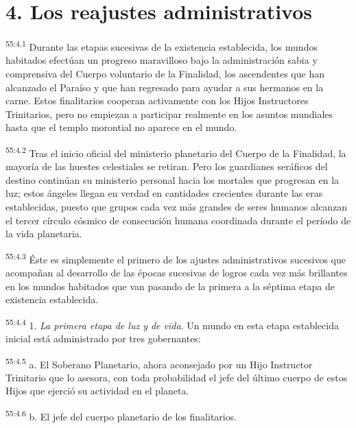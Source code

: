 \section*{4. Los reajustes administrativos}
\par
\textsuperscript{55:4.1} Durante las etapas sucesivas de la existencia establecida, los mundos habitados efectúan un progreso maravilloso bajo la administración sabia y comprensiva del Cuerpo voluntario de la Finalidad, los ascendentes que han alcanzado el Paraíso y que han regresado para ayudar a sus hermanos en la carne. Estos finalitarios cooperan activamente con los Hijos Instructores Trinitarios, pero no empiezan a participar realmente en los asuntos mundiales hasta que el templo morontial no aparece en el mundo.

\par
\textsuperscript{55:4.2} Tras el inicio oficial del ministerio planetario del Cuerpo de la Finalidad, la mayoría de las huestes celestiales se retiran. Pero los guardianes seráficos del destino continúan su ministerio personal hacia los mortales que progresan en la luz; estos ángeles llegan en verdad en cantidades crecientes durante las eras establecidas, puesto que grupos cada vez más grandes de seres humanos alcanzan el tercer círculo cósmico de consecución humana coordinada durante el período de la vida planetaria.

\par
\textsuperscript{55:4.3} Éste es simplemente el primero de los ajustes administrativos sucesivos que acompañan al desarrollo de las épocas sucesivas de logros cada vez más brillantes en los mundos habitados que van pasando de la primera a la séptima etapa de existencia establecida.

\par
\textsuperscript{55:4.4} 1. \textit{La primera etapa de luz y de vida}. Un mundo en esta etapa establecida inicial está administrado por tres gobernantes:

\par
\textsuperscript{55:4.5} a. El Soberano Planetario, ahora aconsejado por un Hijo Instructor Trinitario que lo asesora, con toda probabilidad el jefe del último cuerpo de estos Hijos que ejerció su actividad en el planeta.

\par
\textsuperscript{55:4.6} b. El jefe del cuerpo planetario de los finalitarios.

